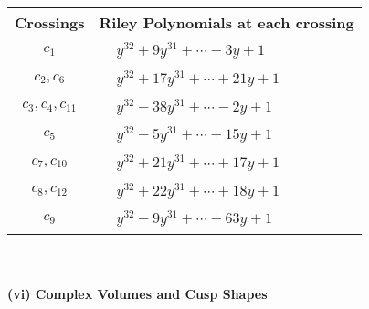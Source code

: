 \documentclass[1p]{elsarticle_modified}
\theoremstyle{definition}
\begin{document}
\begin{tabular}{m{50pt}|m{274pt}}
Crossings & \hspace{64pt}Riley Polynomials at each crossing \\
\hline $$\begin{aligned}c_{1}\end{aligned}$$&$\begin{aligned}
&y^{32}+9 y^{31}+\cdots-3 y+1
\end{aligned}$\\
\hline $$\begin{aligned}c_{2},c_{6}\end{aligned}$$&$\begin{aligned}
&y^{32}+17 y^{31}+\cdots+21 y+1
\end{aligned}$\\
\hline $$\begin{aligned}c_{3},c_{4},c_{11}\end{aligned}$$&$\begin{aligned}
&y^{32}-38 y^{31}+\cdots-2 y+1
\end{aligned}$\\
\hline $$\begin{aligned}c_{5}\end{aligned}$$&$\begin{aligned}
&y^{32}-5 y^{31}+\cdots+15 y+1
\end{aligned}$\\
\hline $$\begin{aligned}c_{7},c_{10}\end{aligned}$$&$\begin{aligned}
&y^{32}+21 y^{31}+\cdots+17 y+1
\end{aligned}$\\
\hline $$\begin{aligned}c_{8},c_{12}\end{aligned}$$&$\begin{aligned}
&y^{32}+22 y^{31}+\cdots+18 y+1
\end{aligned}$\\
\hline $$\begin{aligned}c_{9}\end{aligned}$$&$\begin{aligned}
&y^{32}-9 y^{31}+\cdots+63 y+1
\end{aligned}$\\
\hline
\end{tabular}\\~\\
\newpage\flushleft \textbf{(vi) Complex Volumes and Cusp Shapes}
\end{document}

